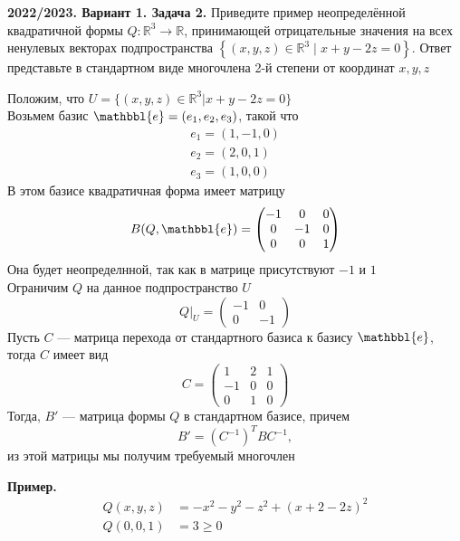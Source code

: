 \documentclass[a4paper]{article}
\newcommand{\e}{\mathbbl{e}}
\begin{document}
\begin{tcolorbox}[colback=blue!20!white, colframe=black!100!black]
    \textbf{2022/2023. Вариант 1. Задача 2.} Приведите пример неопределённой квадратичной формы $Q: \mathbb{R}^{3} \rightarrow \mathbb{R}$, принимающей отрицательные значения на всех ненулевых векторах подпространства $\left\{(x, y, z) \in \mathbb{R}^{3} \mid x+y-2 z=0\right\}$. Ответ представьте в стандартном виде многочлена 2-й степени от координат $x, y, z$
\end{tcolorbox}
Положим, что $U=\{(x,y,z)\in\mathbb{R}^3\vert x+y-2z=0\}$\\[2mm]
\indent Возьмем базис $\e=(e_1,e_2,e_3)$, такой что
$$\begin{aligned}
    e_1=(1,-1,0)\\
    e_2=(2,0,1)\\
    e_3=(1, 0, 0)
\end{aligned}$$
\indent В этом базисе квадратичная форма имеет матрицу
$$B(Q,\e)=\begin{pmatrix}
    -1&0&0\\
    0&-1&0\\
    0&0&1
\end{pmatrix}$$
\indent Она будет неопределнной, так как в матрице присутствуют $-1\text{ и }1$\\[2mm]
\indent Ограничим $Q$ на данное подпространство $U$
$$Q\vert_U=\begin{pmatrix}
    -1&0\\
    0&-1
\end{pmatrix}$$
\indent Пусть $C$ — матрица перехода от стандартного базиса к базису $\e$, тогда $C$ имеет вид
$$C=\begin{pmatrix}
    1&2&1\\
    -1&0&0\\
    0&1&0
\end{pmatrix}$$
\indent Тогда, $B'$ — матрица формы $Q$ в стандартном базисе, причем $$B'=(C^{-1})^TBC^{-1},$$ из этой матрицы мы получим требуемый многочлен\\[2mm]
\begin{tcolorbox}[colback=yellow!20!white, colframe=black!100!black]
    \textbf{Пример.} $$\begin{aligned}
        Q(x,y,z)&=-x^2-y^2-z^2+(x+2-2z)^2\\
        Q(0,0,1)&=3\geqslant0
    \end{aligned}$$
\end{tcolorbox}
\newpage
\end{document}

